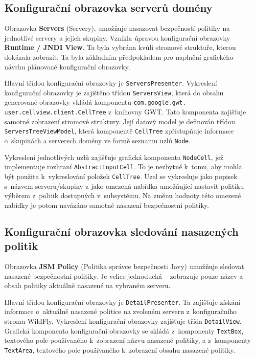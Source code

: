 \subsection{Konfigurační obrazovka serverů domény} \label{implGuiServers}

Obrazovka {\bf Servers} (Servery), umožňuje nasazovat bezpečností politiky na jednotlivé servery a jejich skupiny. Vznikla úpravou konfigurační obrazovky {\bf Runtime / JNDI View}. Ta byla vybrána kvůli stromové struktuře, kterou dokázala zobrazit. Ta byla základním předpokladem pro naplnění grafického návrhu plánované konfigurační obrazovky.

Hlavní třídou konfigurační obrazovky je {\tt ServersPresenter}. Vykreslení konfigurační obrazovky je zajištěno třídou {\tt ServersView}, která do obsahu generované obrazovky vkládá komponentu {\tt com.google.gwt. user.cellview.client.CellTree} z~knihovny GWT. Tato komponenta zajišťuje samotné zobrazení stromové struktury.
Její datový model je definován třídou {\tt ServersTreeViewModel}, která komponentě {\tt CellTree} zpřístupňuje informace o~skupinách a serverech domény ve formě seznamu uzlů {\tt Node}.

Vykreslení jednotlivých uzlů zajišťuje grafická komponenta {\tt NodeCell}, jež implementuje rozhraní {\tt AbstractInputCell}. To je nezbytné k~tomu, aby mohla být použita k~vykreslování položek {\tt CellTree}.
Uzel se vykresluje jako popisek s~názvem serveru/skupiny a jako omezená nabídka umožňující nastavit politiku výběrem z~politik dostupných v~subsystému.
Na změnu hodnoty této omezené nabídky je potom navázáno samotné nasazení bezpečnostní politiky.

\subsection{Konfigurační obrazovka sledování nasazených politik} \label{implGuiServers}

Obrazovka {\bf JSM Policy} (Politika správce bezpečnosti Javy) umožňuje sledovat nasazené bezpečnostní politiky. Je velice jednoduchá -- zobrazuje pouze název a obsah politiky aktuálně nasazené na vybraném serveru.

Hlavní třídou konfigurační obrazovky je {\tt DetailPresenter}. Ta zajišťuje získání informace o~aktuálně nasazené politice na zvoleném serveru z~konfiguračního stromu WildFly. Vykreslení konfigurační obrazovky zajišťuje třída {\tt DetailView}. Grafická komponenta konfigurační obrazovky se skládá z~komponenty {\tt TextBox}, textového pole používaného k~zobrazení názvu nasazené politiky, a z~komponenty {\tt TextArea}, textového pole používaného k~zobrazení obsahu nasazené politiky.

